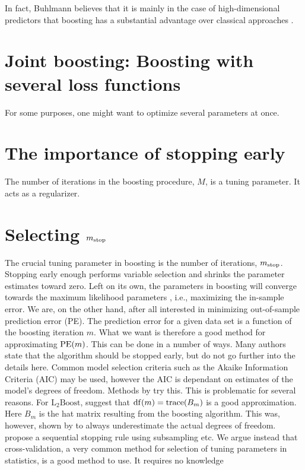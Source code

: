 In fact, Buhlmann believes that it is mainly in the case of high-dimensional predictors that boosting has a substantial advantage over classical approaches \citep{buhlmann2006}.

\section{Joint boosting: Boosting with several loss functions}
For some purposes, one might want to optimize several parameters at once.

\section{The importance of stopping early}
The number of iterations in the boosting procedure, $M$, is a tuning parameter. It acts as a regularizer.


\section{Selecting $m_{\text{stop}}$}
The crucial tuning parameter in boosting is the number of iterations, $m_{\text{stop}}$. Stopping early enough performs variable selection and shrinks the parameter estimates toward zero. Left on its own, the parameters in boosting will converge towards the maximum likelihood parameters , i.e., maximizing the in-sample error. We are, on the other hand, after all interested in minimizing out-of-sample prediction error (PE). The prediction error for a given data set is a function of the boosting iteration $m$. What we want is therefore a good method for approximating $\operatorname{PE}(m)$. This can be done in a number of ways. Many authors state that the algorithm should be stopped early, but do not go further into the details here. Common model selection criteria such as the Akaike Information Criteria (AIC) may be used, however the AIC is dependant on estimates of the model's degrees of freedom. Methods by \citet{chang2010} try this. This is problematic for several reasons. For $\text{L}_2\text{Boost}$, \citet{buhlmann} suggest that $\operatorname{df}(m)=\operatorname{trace}(B_m)$ is a good approximation. Here $B_m$ is the hat matrix resulting from the boosting algorithm. This was, however, shown by \citet{hastie2007} to always underestimate the actual degrees of freedom. \citet{mayr-hofner} propose a sequential stopping rule using subsampling etc. We argue instead that cross-validation, a very common method for selection of tuning parameters in statistics, is a good method to use. It requires no knowledge


